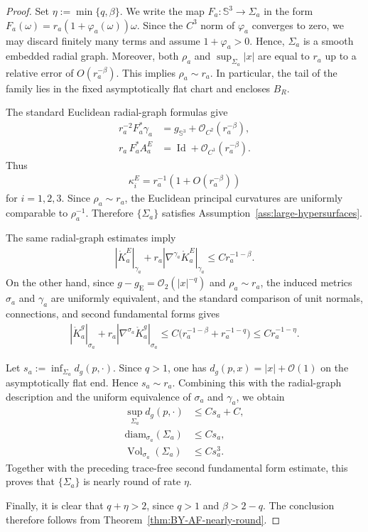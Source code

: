 \documentclass[10pt]{amsart}
\newcommand{\Sph}{\mathbb{S}}
\newcommand{\gE}{g_{\mathrm{E}}}
\newcommand{\Vol}{\operatorname{Vol}}
\newcommand{\Id}{\operatorname{Id}}
\newcommand{\diam}{\mathrm{diam}}
\theoremstyle{plain}
\theoremstyle{remark}
\begin{document}
	\begin{proof}
		Set $\eta := \min\{q, \beta\}$. We write the map $F_a:\Sph^3 \to \Sigma_a$ in the form $F_a(\omega) = r_a(1 + \varphi_a(\omega))\omega$. Since the $C^3$ norm of $\varphi_a$ converges to zero, we may discard finitely many terms and assume $1 + \varphi_a > 0$. Hence, $\Sigma_a$ is a smooth embedded radial graph. Moreover, both $\rho_a$ and $\sup_{\Sigma_a} |x|$ are equal to $r_a$ up to a relative error of $O(r_a^{-\beta})$. This implies $\rho_a \sim r_a$. In particular, the tail of the family lies in the fixed asymptotically flat chart and encloses $B_R$.
		
		The standard Euclidean radial-graph formulas give
		\begin{align*}
			r_a^{-2}F_a^*\gamma_a
			&=
			g_{\Sph^3}+\mathcal O_{C^2}(r_a^{-\beta}),\\
			r_a\,F_a^*A_a^E
			&=
			\Id+\mathcal O_{C^1}(r_a^{-\beta}).
		\end{align*}
		Thus
		\begin{align*}
			\kappa_i^E=r_a^{-1}(1+O(r_a^{-\beta}))
		\end{align*}
		for $i=1,2,3$. Since
		$\rho_a\sim r_a$, the Euclidean principal curvatures are uniformly comparable to
		$\rho_a^{-1}$. Therefore $\{\Sigma_a\}$ satisfies
		Assumption~\ref{ass:large-hypersurfaces}.
		
		The same radial-graph estimates imply
		\begin{align*}
			\left|\mathring K_a^E\right|_{\gamma_a}
			+
			r_a\left|\nabla^{\gamma_a}\mathring K_a^E\right|_{\gamma_a}
			\le
			Cr_a^{-1-\beta}.
		\end{align*}
		On the other hand, since $g-\gE=\mathcal O_2(|x|^{-q})$ and $\rho_a\sim r_a$, the induced
		metrics $\sigma_a$ and $\gamma_a$ are uniformly equivalent, and the standard comparison
		of unit normals, connections, and second fundamental forms gives
		\begin{align*}
			\left|\mathring K_a^g\right|_{\sigma_a}
			+
			r_a\left|\nabla^{\sigma_a}\mathring K_a^g\right|_{\sigma_a}
			\le
			C\bigl(r_a^{-1-\beta}+r_a^{-1-q}\bigr)
			\le
			Cr_a^{-1-\eta}.
		\end{align*}
		
		Let $s_a:=\inf_{\Sigma_a}d_g(p,\cdot)$. Since $q>1$, one has
		$d_g(p,x)=|x|+\mathcal O(1)$ on the asymptotically flat end. Hence $s_a\sim r_a$. Combining this
		with the radial-graph description and the uniform equivalence of $\sigma_a$ and $\gamma_a$,
		we obtain
		\begin{align*}
			\sup_{\Sigma_a}d_g(p,\cdot)
			&\le
			Cs_a+C,\\
			\diam_{\sigma_a}(\Sigma_a)
			&\le
			Cs_a,\\
			\Vol_{\sigma_a}(\Sigma_a)
			&\le
			Cs_a^3.
		\end{align*}
		Together with the preceding trace-free second fundamental form estimate, this proves that
		$\{\Sigma_a\}$ is nearly round of rate $\eta$.
		
		Finally, it is clear that $q+\eta>2$, since $q>1$ and $\beta>2-q$. The conclusion therefore follows from
		Theorem~\ref{thm:BY-AF-nearly-round}.
	\end{proof}
	
\end{document}
